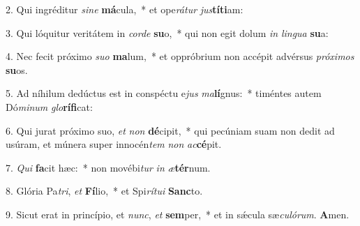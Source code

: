 2. Qui ingréditur \textit{si}\textit{ne} \textbf{má}cula,~*  et ope\textit{rá}\textit{tur} \textit{jus}\textbf{tí}\textbf{ti}am:\

3. Qui lóquitur veritátem in \textit{cor}\textit{de} \textbf{su}o,~*  qui non egit dolum \textit{in} \textit{lin}\textit{gua} \textbf{su}a:\

4. Nec fecit próximo \textit{su}\textit{o} \textbf{ma}lum,~*  et oppróbrium non accépit advérsus \textit{pró}\textit{xi}\textit{mos} \textbf{su}os.\

5. Ad níhilum dedúctus est in conspéctu e\textit{jus} \textit{ma}\textbf{lí}gnus:~*  timéntes autem Dó\textit{mi}\textit{num} \textit{glo}\textbf{rí}\textbf{fi}cat:\

6. Qui jurat próximo suo, \textit{et} \textit{non} \textbf{dé}cipit,~*  qui pecúniam suam non dedit ad usúram, et múnera super innocén\textit{tem} \textit{non} \textit{ac}\textbf{cé}pit.\

7. \textit{Qui} \textbf{fa}cit hæc:~*  non movébi\textit{tur} \textit{in} \textit{æ}\textbf{tér}num.\

8. Glória Pa\textit{tri}, \textit{et} \textbf{Fí}lio,~*  et Spi\textit{rí}\textit{tu}\textit{i} \textbf{Sanc}to.\

9. Sicut erat in princípio, et \textit{nunc}, \textit{et} \textbf{sem}per,~*  et in sǽcula sæ\textit{cu}\textit{ló}\textit{rum}. \textbf{A}men.\

